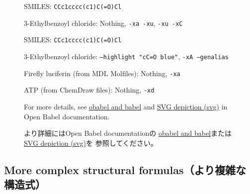 \documentclass[12pt]{ltjsarticle}
\begin{document}
\begin{figure}[ht]
  \centering
   \hspace{1cm}
   \hspace{1cm}
  \caption{3-Ethylbenzoyl chloride: Nothing, \texttt{-xa -xu}, \texttt{-xu -xC}}
  SMILES: \verb|CCc1cccc(c1)C(=O)Cl|
\end{figure}

\begin{figure}[ht]
  \centering
   \hspace{1cm}
  \caption{3-Ethylbenzoyl chloride: \texttt{--highlight "cC=O blue"}, \texttt{-xA --genalias}}
  SMILES: \verb|CCc1cccc(c1)C(=O)Cl|
\end{figure}

\clearpage

\begin{figure}[ht]
  \centering
   \hspace{1cm}
  \caption{Firefly luciferin (from MDL Molfiles): Nothing, \texttt{-xa}}
\end{figure}

\begin{figure}[ht]
  \centering
   \hspace{1cm}
  \caption{ATP (from ChemDraw files): Nothing, \texttt{-xd}}
\end{figure}

\begin{figure}[ht]
For more details, see
\href{http://openbabel.org/docs/dev/Command-line_tools/babel.html}{obabel and babel}
and
\href{http://openbabel.org/docs/dev/FileFormats/SVG_2D_depiction.html}{SVG depiction (svg)}
in Open Babel documentation.

より詳細にはOpen Babel documentationの
\href{http://openbabel.org/docs/dev/Command-line_tools/babel.html}{obabel and babel}または
\href{http://openbabel.org/docs/dev/FileFormats/SVG_2D_depiction.html}{SVG depiction (svg)}を
参照してください。
\end{figure}

\clearpage

\subsection{More complex structural formulas（より複雑な構造式）}
\end{document}
